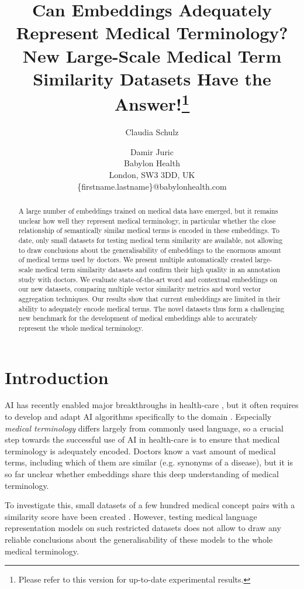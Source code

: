 \documentclass[letterpaper]{article} %
\title{Can Embeddings Adequately Represent Medical Terminology?\\ New Large-Scale Medical Term Similarity Datasets Have the Answer!\thanks{Please refer to this version for up-to-date experimental results.}}
\author{Claudia Schulz \and Damir Juric\\
Babylon Health\\
London, SW3 3DD, UK\\
\{firstname.lastname\}@babylonhealth.com}
\begin{document}
\maketitle

\begin{abstract}
A large number of embeddings trained on medical data have emerged, but it remains unclear how well they represent medical terminology, in particular whether the close relationship of semantically similar medical terms is encoded in these embeddings.
To date, only small datasets for testing medical term similarity are available, not allowing to draw conclusions about the generalisability of embeddings to the enormous amount of medical terms used by doctors.
We present multiple automatically created large-scale medical term similarity datasets and confirm their high quality in an annotation study with doctors.
We evaluate state-of-the-art word and contextual embeddings on our new datasets, comparing multiple vector similarity metrics and word vector aggregation techniques.
Our results show that current embeddings are limited in their ability to adequately encode medical terms.
The novel datasets thus form a challenging new benchmark for the development of medical embeddings able to accurately represent the whole medical terminology.
\end{abstract}


\section{Introduction}

AI has recently enabled major breakthroughs in health-care \cite{ardila2019end,liu2018deep}, but it often requires to develop and adapt AI algorithms specifically to the domain \cite{Neumann2019ScispaCyFA}.
Especially \emph{medical terminology} differs largely from commonly used language, so
a crucial step towards the successful use of AI in health-care is to ensure that medical terminology is adequately encoded.
Doctors know a vast amount of medical terms, including which of them are similar (e.g. synonyms of a disease), but it is so far unclear whether
embeddings
share this deep understanding of medical terminology.

To investigate this, small datasets of a few hundred medical concept pairs
with a similarity score
have been created
\cite{PedersenPPC2007,PakhomovEtAl2010,ChiuPVK2018}.
However, testing medical language representation models on such restricted datasets does not allow to draw any reliable conclusions about the generalisability of these models to the whole medical terminology.
\end{document}

